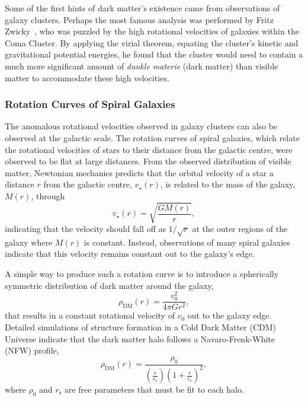 Some of the first hints of dark matter's existence came from observations of galaxy clusters. Perhaps the most famous analysis was performed by Fritz Zwicky~\cite{Zwicky:1937zza_MassesNebulaeClusters}, who was puzzled by the high rotational velocities of galaxies within the Coma Cluster. By applying the virial theorem, equating the cluster's kinetic and gravitational potential energies, he found that the cluster would need to contain a much more significant amount of \textit{dunkle materie} (dark matter) than visible matter to accommodate these high velocities.

\subsubsection*{Rotation Curves of Spiral Galaxies}

The anomalous rotational velocities observed in galaxy clusters can also be observed at the galactic scale. The rotation curves of spiral galaxies, which relate the rotational velocities of stars to their distance from the galactic centre, were observed to be flat at large distances. From the observed distribution of visible matter, Newtonian mechanics predicts that the orbital velocity of a star a distance $r$ from the galactic centre, $v_\star(r)$, is related to the mass of the galaxy, $M(r)$, through
\begin{equation}
    v_\star(r) = \sqrt{\frac{G M(r)}{r}},
\end{equation}
indicating that the velocity should fall off as $1/\sqrt{r}$ at the outer regions of the galaxy where $M(r)$ is constant. Instead, observations of many spiral galaxies indicate that this velocity remains constant out to the galaxy's edge. 

A simple way to produce such a rotation curve is to introduce a spherically symmetric distribution of dark matter around the galaxy,
\begin{equation}
    \rho_{\mathrm{DM}}(r) = \frac{v_0^2}{4 \pi G r^2},
\end{equation}
that results in a constant rotational velocity of $v_0$ out to the galaxy edge. Detailed simulations of structure formation in a Cold Dark Matter (CDM) Universe indicate that the dark matter halo follows a Navaro-Frenk-White (NFW) profile, 
\begin{equation}
    \rho_{\mathrm{DM}}(r) = \frac{\rho_0}{\left( \frac{r}{r_\mathrm{s}}\right)\left( 1 + \frac{r}{r_\mathrm{s}}\right)^2},
\end{equation}
where $\rho_0$ and $r_\mathrm{s}$ are free parameters that must be fit to each halo. 

